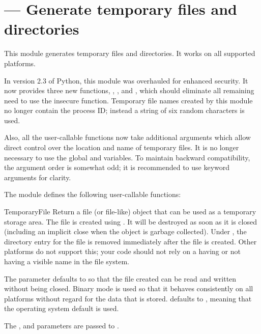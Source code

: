 \section{ ---
         Generate temporary files and directories}



This module generates temporary files and directories.  It works on
all supported platforms.

In version 2.3 of Python, this module was overhauled for enhanced
security.  It now provides three new functions,
, , and
, which should eliminate all remaining need to use
the insecure  function.  Temporary file names created
by this module no longer contain the process ID; instead a string of
six random characters is used.

Also, all the user-callable functions now take additional arguments
which allow direct control over the location and name of temporary
files.  It is no longer necessary to use the global  and
 variables.  To maintain backward compatibility, the
argument order is somewhat odd; it is recommended to use keyword
arguments for clarity.

The module defines the following user-callable functions:

\begin{funcdesc}{TemporaryFile}{
				}
Return a file (or file-like) object that can be used as a temporary
storage area.  The file is created using . It will
be destroyed as soon as it is closed (including an implicit close when
the object is garbage collected).  Under \UNIX, the directory entry
for the file is removed immediately after the file is created.  Other
platforms do not support this; your code should not rely on a
 having or not having a visible name in the file
system.

The  parameter defaults to  so that the file
created can be read and written without being closed.  Binary mode is
used so that it behaves consistently on all platforms without regard
for the data that is stored.   defaults to ,
meaning that the operating system default is used.

The ,  and  parameters are passed to
.
\end{funcdesc}

